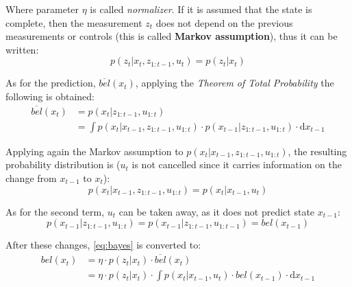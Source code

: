 Where parameter $\eta$ is called \emph{normalizer}. If it is assumed that the state is complete, then the measurement $z_t$ does not depend on the previous measurements or controls (this is called \textbf{Markov assumption}), thus it can be written:
\begin{equation}
  p(z_t|x_t,z_{1:t-1},u_t) = p(z_t|x_t)
  \label{eq:markovf}
\end{equation}  

As for the prediction, $\overline{bel}(x_t)$, applying the \emph{Theorem of Total Probability} the following is obtained:
\begin{equation}
  \begin{split}
    \overline{bel}(x_t) & = p(x_t|z_{1:t-1},u_{1:t})\\
                        & = \int p(x_t|x_{t-1},z_{1:t-1},u_{1:t})\cdot p(x_{t-1}|z_{1:t-1},u_{1:t})\cdot\mathrm{d}x_{t-1}
  \end{split}
  \label{eq:predicteq}  
\end{equation}  

Applying again the Markov assumption to $ p(x_t|x_{t-1},z_{1:t-1},u_{1:t})$, the resulting probability distribution is ($u_t$ is not cancelled since it carries information on the change from $x_{t-1}$ to $x_t$):
\begin{equation}
  p(x_t|x_{t-1},z_{1:t-1},u_{1:t}) = p(x_t|x_{t-1},u_t)
  \label{eq:markovs}
\end{equation}

As for the second term, $u_t$ can be taken away, as it does not predict state $x_{t-1}$:
\begin{equation}
  p(x_{t-1}|z_{1:t-1},u_{1:t}) = p(x_{t-1}|z_{1:t-1},u_{1:t-1}) = bel(x_{t-1})
  \label{eq:beliefprev}
\end{equation}

After these changes, \autoref{eq:bayes} is converted to:
\begin{equation}
  \begin{split}
    bel(x_t) & = \eta\cdot p(z_t|x_t)\cdot \overline{bel}(x_t)\\
                        & = \eta\cdot p(z_t|x_t)\cdot \int p(x_t|x_{t-1},u_t)\cdot bel(x_{t-1})\cdot\mathrm{d}x_{t-1}
  \end{split}
  \label{eq:bayesfinal}  
\end{equation} 

